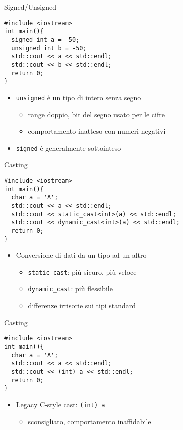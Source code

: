 \begin{frame}[fragile]{Signed/Unsigned}
  \vfill
  \begin{lstlisting}
#include <iostream>
int main(){
  signed int a = -50;
  unsigned int b = -50;
  std::cout << a << std::endl;
  std::cout << b << std::endl;
  return 0;
}
  \end{lstlisting}
  \vfill
  \begin{itemize}
    \item \lstinline$unsigned$ è un tipo di intero senza segno
    \begin{itemize}
      \item range doppio, bit del segno usato per le cifre
      \item comportamento inatteso con numeri negativi
    \end{itemize}
    \vfill
    \item \lstinline$signed$ è generalmente sottointeso
  \end{itemize}
  \vfill
\end{frame}

\begin{frame}[fragile]{Casting}
  \vfill
  \begin{lstlisting}
#include <iostream>
int main(){
  char a = 'A';
  std::cout << a << std::endl;
  std::cout << static_cast<int>(a) << std::endl;
  std::cout << dynamic_cast<int>(a) << std::endl;
  return 0;
}
  \end{lstlisting}
  \vfill
  \begin{itemize}
    \item Conversione di dati da un tipo ad un altro
    \begin{itemize}
      \item \lstinline$static_cast$: più sicuro, più veloce
      \item \lstinline$dynamic_cast$: più flessibile
      \item differenze irrisorie sui tipi standard
    \end{itemize}
  \end{itemize}
  \vfill
\end{frame}

\begin{frame}[fragile]{Casting}
  \vfill
  \begin{lstlisting}
#include <iostream>
int main(){
  char a = 'A';
  std::cout << a << std::endl;
  std::cout << (int) a << std::endl;
  return 0;
}
  \end{lstlisting}
  \vfill
  \begin{itemize}
    \item Legacy C-style cast: \lstinline$(int) a$
    \begin{itemize}
      \item sconsigliato, comportamento inaffidabile
    \end{itemize}
  \end{itemize}
  \vfill
\end{frame}

